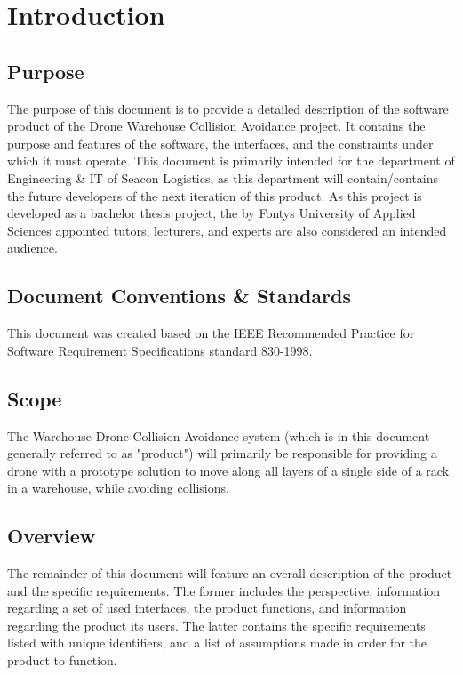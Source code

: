 \chapter{Introduction}
\label{ch:introduction}

\section{Purpose}
The purpose of this document is to provide a detailed description of the software product of the Drone Warehouse Collision Avoidance project. It contains the purpose and features of the software, the interfaces, and the constraints under which it must operate. This document is primarily intended for the department of Engineering \& IT of Seacon Logistics, as this department will contain/contains the future developers of the next iteration of this product. As this project is developed as a bachelor thesis project, the by Fontys University of Applied Sciences appointed tutors, lecturers, and experts are also considered an intended audience.

\section{Document Conventions \& Standards}
This document was created based on the IEEE Recommended Practice for Software Requirement Specifications standard 830-1998.

\section{Scope}
The Warehouse Drone Collision Avoidance system (which is in this document generally referred to as "product") will primarily be responsible for providing a drone with a prototype solution to move along all layers of a single side of a rack in a warehouse, while avoiding collisions.

\section{Overview}
The remainder of this document will feature an overall description of the product and the specific requirements. The former includes the perspective, information regarding a set of used interfaces, the product functions, and information regarding the product its users. The latter contains the specific requirements listed with unique identifiers, and a list of assumptions made in order for the product to function.

